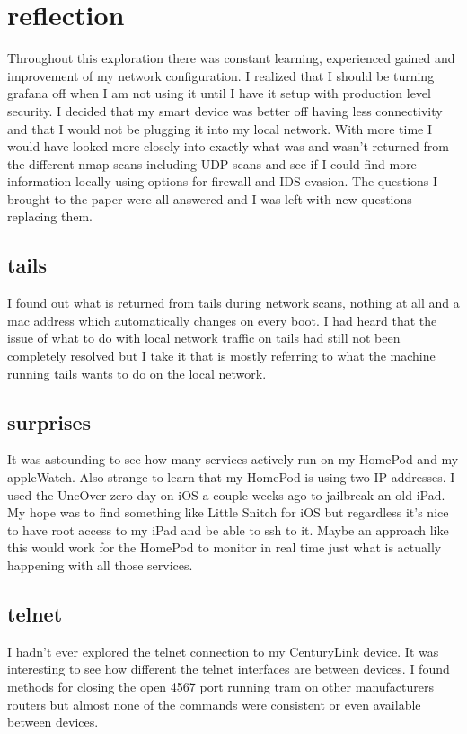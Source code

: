 \documentclass[10pt]{article}
\begin{document}
\section*{reflection}
Throughout this exploration there was constant learning, experienced gained and improvement of my network configuration. I realized that I should be turning 
grafana off when I am not using it until I have it setup with production level security. I decided that my smart device was better off 
having less connectivity and that I would not be plugging it into my local network. With more time I would have looked more closely into exactly
what was and wasn't returned from the different nmap scans including UDP scans and see if I could find more information locally using options for 
firewall and IDS evasion. The questions I brought to the paper were all answered and I was left with new questions replacing them.

\subsection*{tails}
I found out what is returned from tails during network scans, nothing at all and a mac address which automatically changes on every boot.
I had heard that the issue of what to do with local network traffic on tails had still not been completely resolved but I take it that is mostly
referring to what the machine running tails wants to do on the local network.

\subsection*{surprises}
It was astounding to see how many services actively run on my HomePod and my appleWatch. Also strange to learn that my HomePod is using two
IP addresses. I used the UncOver zero-day on iOS a couple weeks ago to jailbreak an old iPad. My hope was to find something like Little Snitch
for iOS but regardless it's nice to have root access to my iPad and be able to ssh to it. Maybe an approach like this would work for the HomePod to
monitor in real time just what is actually happening with all those services.

\subsection*{telnet}
I hadn't ever explored the telnet connection to my CenturyLink device. It was interesting to see how different the telnet interfaces are between devices. 
I found methods for closing the open 4567 port running tram on other manufacturers routers but almost none of the commands were consistent or even available 
between devices.
\end{document}
